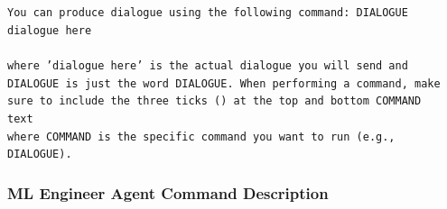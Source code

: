 \documentclass[11pt, a4paper]{gdm_format}
\begin{document}
\begin{tcolorbox}[breakable,colback=orange!5!white, colframe=orange!80!black, title=PhD Student Results Interpretation Command Prompt]
\texttt{You can produce dialogue using the following command: \textasciigrave\textasciigrave\textasciigrave DIALOGUE\\dialogue here\\\textasciigrave\textasciigrave\textasciigrave\\ where 'dialogue here' is the actual dialogue you will send and DIALOGUE is just the word DIALOGUE. When performing a command, make sure to include the three ticks (\textasciigrave\textasciigrave\textasciigrave) at the top and bottom \textasciigrave\textasciigrave\textasciigrave COMMAND\\text\\ \textasciigrave\textasciigrave\textasciigrave where COMMAND is the specific command you want to run (e.g., DIALOGUE).}
\end{tcolorbox}

\subsubsection{ML Engineer Agent Command Description}
\end{document}
